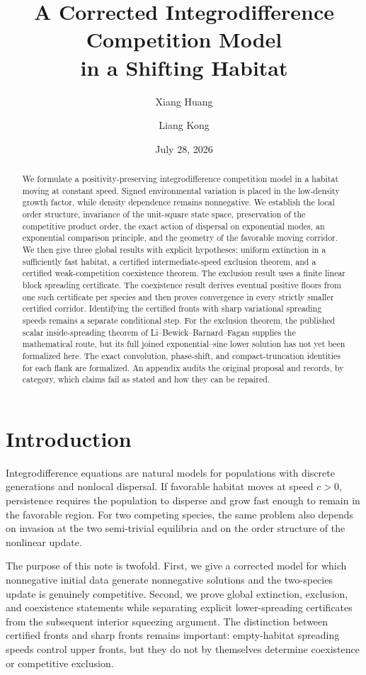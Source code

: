 \documentclass[11pt]{article}
\title{A Corrected Integrodifference Competition Model\\
in a Shifting Habitat}
\author{Xiang Huang \and Liang Kong}
\date{July 28, 2026}
\theoremstyle{definition}
\begin{document}
\maketitle

\begin{abstract}
We formulate a positivity-preserving integrodifference competition model in
a habitat moving at constant speed.  Signed environmental variation is
placed in the low-density growth factor, while density dependence remains
nonnegative.  We establish the local order structure, invariance of the
unit-square state space, preservation of the competitive product order, the
exact action of dispersal on exponential modes, an exponential comparison
principle, and the geometry of the favorable moving corridor.  We then give
three global results with explicit hypotheses: uniform extinction in a
sufficiently fast habitat, a certified intermediate-speed exclusion theorem,
and a certified weak-competition coexistence theorem.  The exclusion result
uses a finite linear block spreading certificate.  The coexistence result
derives eventual positive floors from one such certificate per species and
then proves convergence in every strictly smaller certified corridor.
Identifying the certified fronts with sharp variational spreading speeds
remains a separate conditional step.  For the exclusion theorem, the
published scalar inside-spreading theorem of
Li--Bewick--Barnard--Fagan supplies the mathematical route, but its
full joined exponential--sine lower solution has not yet been formalized
here.  The exact convolution, phase-shift, and compact-truncation identities
for each flank are formalized.  An appendix audits the original
proposal and records, by category, which claims fail as stated and how they
can be repaired.
\end{abstract}

\section{Introduction}

Integrodifference equations are natural models for populations with
discrete generations and nonlocal dispersal.  If favorable habitat moves at
speed \(c>0\), persistence requires the population to disperse and grow fast
enough to remain in the favorable region.  For two competing species, the
same problem also depends on invasion at the two semi-trivial equilibria and
on the order structure of the nonlinear update.

The purpose of this note is twofold.  First, we give a corrected model for
which nonnegative initial data generate nonnegative solutions and the
two-species update is genuinely competitive.  Second, we prove global
extinction, exclusion, and coexistence statements while separating explicit
lower-spreading certificates from the subsequent interior squeezing
argument.  The distinction between certified fronts and sharp fronts remains
important: empty-habitat spreading speeds control upper fronts, but they do
not by themselves determine coexistence or competitive exclusion.
\end{document}
